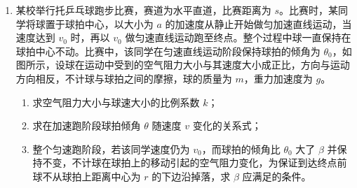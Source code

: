 \documentclass[\gkver]{gaokaozhenti}
\begin{document}
\begin{enumerate}
{$y_{2}=l\tan\theta$

$y=y_{1}+y_{2}$

得 $y=d(5\lambda-\sqrt{25\lambda^{2}-9})+\frac{3l}{\sqrt{25\lambda^{2}-9}}$

}

\item
某校举行托乒乓球跑步比赛，赛道为水平直道，比赛距离为 $s$。比赛时，某同学将球置于球拍中心，以大小为 $a$ 的加速度从静止开始做匀加速直线运动，当速度达到 $v_{0}$ 时，再以 $v_{0}$ 做匀速直线运动跑至终点。整个过程中球一直保持在球拍中心不动。比赛中，该同学在匀速直线运动阶段保持球拍的倾角为 $\theta_{0}$，如图所示，设球在运动中受到的空气阻力大小与其速度大小成正比，方向与运动方向相反，不计球与球拍之间的摩擦，球的质量为 $m$，重力加速度为 $g$。
\begin{enumerate}
	\item
	求空气阻力大小与球速大小的比例系数 $k$；
	\item
	求在加速跑阶段球拍倾角 $\theta$ 随速度 $v$ 变化的关系式；
	\item
	整个匀速跑阶段，若该同学速度仍为 $v_{0}$，而球拍的倾角比 $\theta_{0}$ 大了 $\beta$ 并保持不变，不计球在球拍上的移动引起的空气阻力变化，为保证到达终点前球不从球拍上距离中心为 $r$ 的下边沿掉落，求 $\beta$ 应满足的条件。
\end{enumerate}
\onepicture[align=right, w=4.39cm]{}
\end{enumerate}
\end{document}
